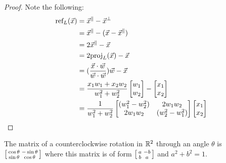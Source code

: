 \documentclass[a4paper,8pt]{article}
\begin{document}
\begin{outline}
    \begin{proof}
      Note the following:
      \begin{align*}
        \text{ref}_{L}(\vec{x}) &= \vec{x}^{\parallel} - \vec{x}^{\perp}\\
                                &= \vec{x}^{\parallel} - (\vec{x} - \vec{x}^{\parallel})\\
                                &= 2\vec{x}^{\parallel} - \vec{x}\\
                                &= 2\text{proj}_{L}(\vec{x})- \vec{x}\\
                                &= (\frac{\vec{x}\cdot\vec{w}}{\vec{w}\cdot\vec{w}})\vec{w} - \vec{x}\\
                                &= \frac{x_1w_1 + x_2w_2}{w_1^2 + w_2^2} \begin{bmatrix} w_1 \\ w_2
                                   \end{bmatrix}-\begin{bmatrix} x_1 \\ x_2 \end{bmatrix}\\
                                &= \frac{1}{w_1^2 + w_2^2}
                                   \begin{bmatrix}
                                     (w_1^2 - w_2^2) & 2w_1w_2 \\
                                     2w_1w_2 & (w_2^2 - w_1^2)
                                   \end{bmatrix}
                                   \begin{bmatrix} x_1 \\ x_2 \end{bmatrix}
      \end{align*}
    \end{proof}

    The matrix of a counterclockwise rotation in \(\mathbb{R}^2\) through an angle \(\theta\) is
    \(\begin{bsmallmatrix} \cos{\theta} & -\sin{\theta} \\ \sin{\theta} & \cos{\theta} \end{bsmallmatrix}\)
    where this matrix is of form \(\begin{bsmallmatrix} a & -b \\ b & a \end{bsmallmatrix}\) and \(a^2 + b^2 = 1\).


\end{outline}
\end{document}
